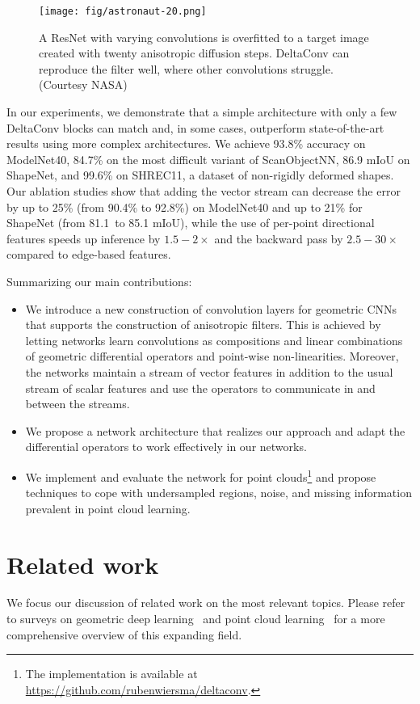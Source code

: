 \documentclass[acmtog, authorversion]{acmart}
\begin{document}
\begin{figure}
    \centering
    \texttt{[image: fig/astronaut-20.png]}
    \caption{A ResNet with varying convolutions is overfitted to a target image created with twenty anisotropic diffusion steps. DeltaConv can reproduce the filter well, where other convolutions struggle. (Courtesy NASA)}
    \label{fig:peronamalik}
\end{figure}

In our experiments, we demonstrate that a simple architecture with only a few DeltaConv blocks can match and, in some cases, outperform state-of-the-art results using more complex architectures. We achieve 93.8\% accuracy on ModelNet40, 84.7\% on the most difficult variant of ScanObjectNN, 86.9 mIoU on ShapeNet, and 99.6\% on SHREC11, a dataset of non-rigidly deformed shapes. Our ablation studies show that adding the vector stream can decrease the error by up to 25\% (from 90.4\% to 92.8\%) on ModelNet40 and up to 21\% for ShapeNet (from 81.1\ to 85.1 mIoU), while the use of per-point directional features speeds up inference by $1.5-2\times$ and the backward pass by $2.5-30\times$ compared to edge-based features.

Summarizing our main contributions:
\begin{itemize}
    \item We introduce a new construction of convolution layers for geometric CNNs that supports the construction of anisotropic filters.
    This is achieved by letting networks learn convolutions as compositions and linear combinations of geometric differential operators and point-wise non-linearities. Moreover, the networks maintain a stream of vector features in addition to the usual stream of scalar features and use the operators to communicate in and between the streams.
    \item We propose a network architecture that realizes our approach and adapt the differential operators to work effectively in our networks.
    \item We implement and evaluate the network for point clouds\footnote{The implementation is available at \url{https://github.com/rubenwiersma/deltaconv}.}
    and propose techniques to cope with undersampled regions, noise, and missing information prevalent in point cloud learning.
\end{itemize}
 \section{Related work}
We focus our discussion of related work on the most relevant topics. Please refer to surveys on geometric deep learning~\cite{Bronstein2017, bronstein2021geometric} and point cloud learning~\cite{guo2020survey, s19194188} for a more comprehensive overview of this expanding field.
\end{document}

